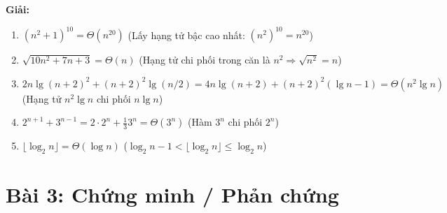 \documentclass[12pt,a4paper]{article}
\begin{document}
\textbf{Giải:}
\begin{enumerate}
    \item[a.] $(n^2 + 1)^{10} = \Theta(n^{20})$ \quad (Lấy hạng tử bậc cao nhất: $(n^2)^{10} = n^{20}$)
    \item[b.] $\sqrt{10n^2 + 7n + 3} = \Theta(n)$ \quad (Hạng tử chi phối trong căn là $n^2 \Rightarrow \sqrt{n^2} = n$)
    \item[c.] $2n \lg(n+2)^2 + (n+2)^2 \lg(n/2) = 4n \lg(n+2) + (n+2)^2(\lg n - 1) = \Theta(n^2 \lg n)$ \quad (Hạng tử $n^2 \lg n$ chi phối $n \lg n$)
    \item[d.] $2^{n+1} + 3^{n-1} = 2 \cdot 2^n + \frac{1}{3}3^n = \Theta(3^n)$ \quad (Hàm $3^n$ chi phối $2^n$)
    \item[e.] $\lfloor\log_2 n\rfloor = \Theta(\log n)$ \quad ($\log_2 n - 1 < \lfloor\log_2 n\rfloor \le \log_2 n$)
\end{enumerate}




\section*{Bài 3: Chứng minh / Phản chứng}
\end{document}
